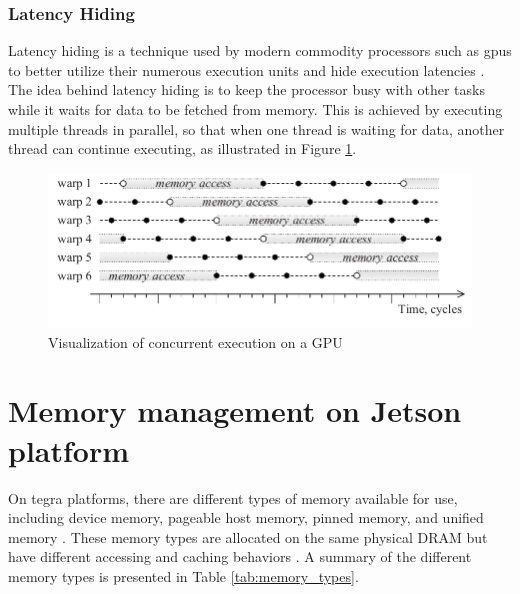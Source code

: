 \subsubsection{Latency Hiding}
Latency hiding is a technique used by modern commodity processors such as \glspl{gpu} to better utilize their numerous execution units and hide execution latencies \cite[35]{volkovLatencyHiding2016}.
The idea behind latency hiding is to keep the processor busy with other tasks while it waits for data to be fetched from memory.
This is achieved by executing multiple threads in parallel, so that when one thread is waiting for data, another thread can continue executing, as illustrated in Figure \ref{fig:concurrency}.

\begin{figure}[H]
    \centering
    \includegraphics[width=.7\textwidth]{figures/PDF/concurrency_p54.pdf}
    \caption{Visualization of concurrent execution on a GPU \cite[54]{volkovLatencyHiding2016}}
    \label{fig:concurrency}
\end{figure}



\section{Memory management on Jetson platform}
\label{sec:jx_memory}
On \gls{tegra} platforms, there are different types of memory available for use, including device memory, pageable host memory, pinned memory, and unified memory \cite[13]{nvidiaCUDAFTegra2023}.
These memory types are allocated on the same physical DRAM but have different accessing and caching behaviors \cite[5]{nvidiaCUDAFTegra2023}.
A summary of the different memory types is presented in Table \ref{tab:memory_types}.


\providecommand{\tmpfootnote}{\footnote{Cached where compute capability is greater than or equal to 7.2 \cite{nvidiaCUDAFTegra2023}. The \jx has compute capability of 7.2 \cite{CUDA2023}}}

